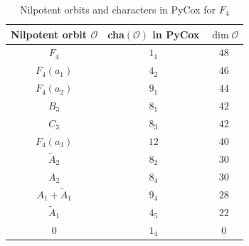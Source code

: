 \documentclass[reqno,12pt]{amsart}
\numberwithin{equation}{section}
\theoremstyle{plain}
\theoremstyle{definition}
\begin{document}
 



	


\begin{table}[htbp]\caption{  Nilpotent orbits and characters in PyCox  for $ F_4$}
	\label{tabcharef4-1}
	\centering
	\renewcommand{\arraystretch}{1.3}
	\setlength\tabcolsep{5pt}
{	\begin{tabular}{|c|c|c|}
		\hline Nilpotent orbit $\mathcal{O}$ & cha$(\mathcal{O})$ in PyCox & $\dim \mathcal{O}$ \\ \hline
 
  $F_4$  &  $1_1$  & $48$ \\\hline
  $F_4(a_1)$  &  $4_2$  & $46$ \\
\hline
  $F_4(a_2)$  &  $9_1$  & $44$ \\
\hline
  $B_3$  &  $8_1$  & $42$ \\
  $C_3$  &  $8_3$  & $42$ \\
\hline
 $F_4(a_3)$  &  $12$  & $40$ \\
\hline
 $\tilde{A}_2$  &  $8_2$  & $30$ \\
 ${A}_2$  &  $8_4$  & $30$ \\
\hline
 $A_1+\tilde{A}_1$  &  $9_4$  & $28$ \\
\hline
 $\tilde{A}_1$  &  $4_5$  & $22$ \\
\hline
 $0$  &  $1_4$  & $0$ \\
\hline

\end{tabular}}
	\bigskip
	
\end{table}
\end{document}
